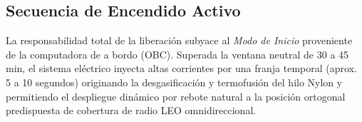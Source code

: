 \subsection{Secuencia de Encendido Activo}
La responsabilidad total de la liberación subyace al \textit{Modo de Inicio} proveniente de la computadora de a bordo (OBC). Superada la ventana neutral de 30 a 45 min, el sistema eléctrico inyecta altas corrientes por una franja temporal (aprox. 5 a 10 segundos) originando la desgasificación y termofusión del hilo Nylon y permitiendo el despliegue dinámico por rebote natural a la posición ortogonal predispuesta de cobertura de radio LEO omnidireccional.
